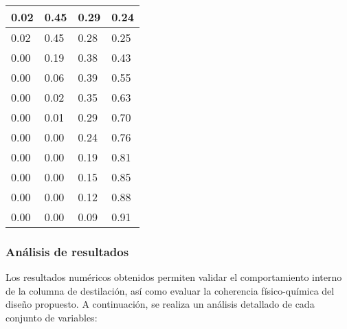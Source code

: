 \begin{table}[ht]
\begin{tabular}{|p{2.5cm}|p{2.5cm}|p{2.5cm}|p{2.5cm}|}
        0.02                        & 0.45                          & 0.29                           & 0.24                           \\ \hline
        0.02                        & 0.45                          & 0.28                           & 0.25                           \\ \hline
        0.00                        & 0.19                          & 0.38                           & 0.43                           \\ \hline
        0.00                        & 0.06                          & 0.39                           & 0.55                           \\ \hline
        0.00                        & 0.02                          & 0.35                           & 0.63                           \\ \hline
        0.00                        & 0.01                          & 0.29                           & 0.70                           \\ \hline
        0.00                        & 0.00                          & 0.24                           & 0.76                           \\ \hline
        0.00                        & 0.00                          & 0.19                           & 0.81                           \\ \hline
        0.00                        & 0.00                          & 0.15                           & 0.85                           \\ \hline
        0.00                        & 0.00                          & 0.12                           & 0.88                           \\ \hline
        0.00                        & 0.00                          & 0.09                           & 0.91                           \\ \hline
    \end{tabular}
\end{table}

\newpage
\subsubsection{Análisis de resultados}
Los resultados numéricos obtenidos permiten validar el comportamiento interno de la columna de destilación, así como evaluar la coherencia físico-química del diseño propuesto. A continuación, se realiza un análisis detallado de cada conjunto de variables:

